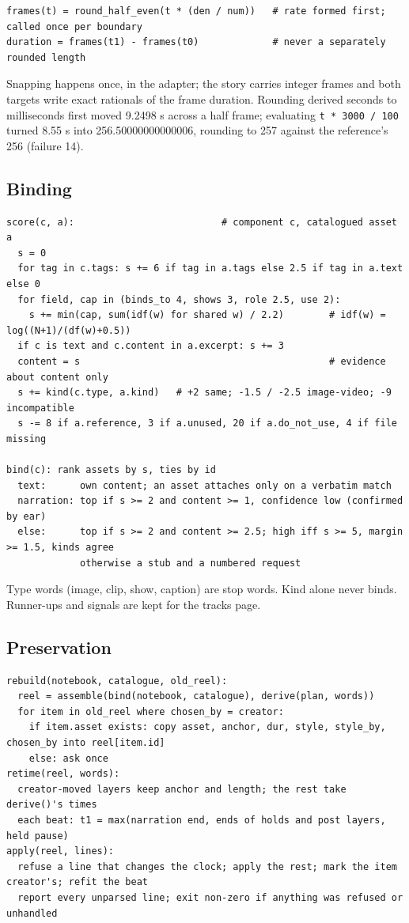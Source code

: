 \documentclass{ceurart}
\begin{document}
\begingroup\small\begin{verbatim}
frames(t) = round_half_even(t * (den / num))   # rate formed first; called once per boundary
duration = frames(t1) - frames(t0)             # never a separately rounded length
\end{verbatim}\endgroup

Snapping happens once, in the adapter; the story carries integer frames
and both targets write exact rationals of the frame duration. Rounding
derived seconds to milliseconds first moved 9.2498 s across a half
frame; evaluating \texttt{t\ *\ 3000\ /\ 100} turned 8.55 s into
256.50000000000006, rounding to 257 against the reference's 256 (failure
14).

\subsection{Binding}\label{binding}

\begingroup\small\begin{verbatim}
score(c, a):                          # component c, catalogued asset a
  s = 0
  for tag in c.tags: s += 6 if tag in a.tags else 2.5 if tag in a.text else 0
  for field, cap in (binds_to 4, shows 3, role 2.5, use 2):
    s += min(cap, sum(idf(w) for shared w) / 2.2)        # idf(w) = log((N+1)/(df(w)+0.5))
  if c is text and c.content in a.excerpt: s += 3
  content = s                                            # evidence about content only
  s += kind(c.type, a.kind)   # +2 same; -1.5 / -2.5 image-video; -9 incompatible
  s -= 8 if a.reference, 3 if a.unused, 20 if a.do_not_use, 4 if file missing

bind(c): rank assets by s, ties by id
  text:      own content; an asset attaches only on a verbatim match
  narration: top if s >= 2 and content >= 1, confidence low (confirmed by ear)
  else:      top if s >= 2 and content >= 2.5; high iff s >= 5, margin >= 1.5, kinds agree
             otherwise a stub and a numbered request
\end{verbatim}\endgroup

Type words (image, clip, show, caption) are stop words. Kind alone never
binds. Runner-ups and signals are kept for the tracks page.

\subsection{Preservation}\label{preservation}

\begingroup\small\begin{verbatim}
rebuild(notebook, catalogue, old_reel):
  reel = assemble(bind(notebook, catalogue), derive(plan, words))
  for item in old_reel where chosen_by = creator:
    if item.asset exists: copy asset, anchor, dur, style, style_by, chosen_by into reel[item.id]
    else: ask once
retime(reel, words):
  creator-moved layers keep anchor and length; the rest take derive()'s times
  each beat: t1 = max(narration end, ends of holds and post layers, held pause)
apply(reel, lines):
  refuse a line that changes the clock; apply the rest; mark the item creator's; refit the beat
  report every unparsed line; exit non-zero if anything was refused or unhandled
\end{verbatim}\endgroup
\end{document}
